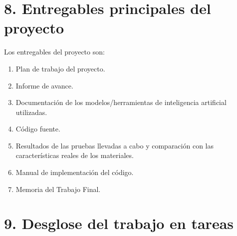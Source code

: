 \documentclass[
11pt, %
codirector, %
]{charter}
\begin{document}
\section{8. Entregables principales del proyecto}

Los entregables del proyecto son:

\begin{enumerate}
	\item Plan de trabajo del proyecto.
	\item Informe de avance.
	\item Documentación de los modelos/herramientas de inteligencia artificial utilizadas.
	\item Código fuente.
	\item Resultados de las pruebas llevadas a cabo y comparación con las características reales de los materiales.
	\item Manual de implementación del código.
	\item Memoria del Trabajo Final.
\end{enumerate}


\section{9. Desglose del trabajo en tareas}
\label{sec:wbs}
\end{document}

